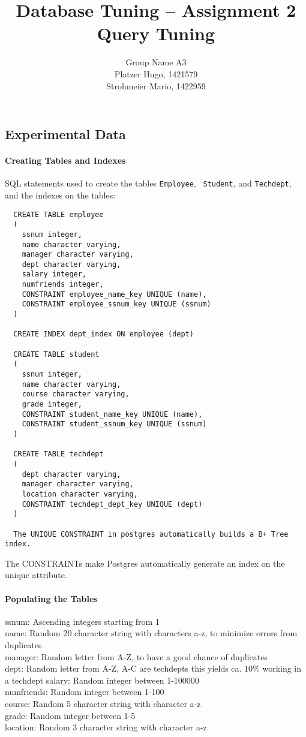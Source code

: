 \documentclass[11pt]{scrartcl}
\title{
  \textbf{\large Database Tuning -- Assignment 2}\\
  Query Tuning
}
\author{
 Group Name A3\\
 \large Platzer Hugo, 1421579 \\
 \large Strohmeier Mario, 1422959
}
\begin{document}
\maketitle

\subsection*{Experimental Data}

\paragraph{Creating Tables and Indexes}

SQL statements used to create the tables {\tt Employee}, {\tt
  Student}, and {\tt Techdept}, and the indexes on the tables:

{\small
\begin{verbatim}
  CREATE TABLE employee
  (
    ssnum integer,
    name character varying,
    manager character varying,
    dept character varying,
    salary integer,
    numfriends integer,
    CONSTRAINT employee_name_key UNIQUE (name),
    CONSTRAINT employee_ssnum_key UNIQUE (ssnum)
  )

  CREATE INDEX dept_index ON employee (dept)

  CREATE TABLE student
  (
    ssnum integer,
    name character varying,
    course character varying,
    grade integer,
    CONSTRAINT student_name_key UNIQUE (name),
    CONSTRAINT student_ssnum_key UNIQUE (ssnum)
  )

  CREATE TABLE techdept
  (
    dept character varying,
    manager character varying,
    location character varying,
    CONSTRAINT techdept_dept_key UNIQUE (dept)
  )

  The UNIQUE CONSTRAINT in postgres automatically builds a B+ Tree index.
\end{verbatim}
}

The CONSTRAINTs make Postgres automatically generate an index on the
unique attribute.

\paragraph{Populating the Tables}

ssnum: Ascending integers starting from 1\\
name: Random 20 character string with characters a-z, to minimize errors from duplicates\\
manager: Random letter from A-Z, to have a good chance of duplicates\\
dept: Random letter from A-Z, A-C are techdepts
this yields ca. 10\% working in a techdept
salary: Random integer between 1-100000\\
numfriends: Random integer between 1-100\\
course: Random 5 character string with character a-z\\
grade: Random integer between 1-5\\
location: Random 3 character string with character a-z\\
\end{document}
